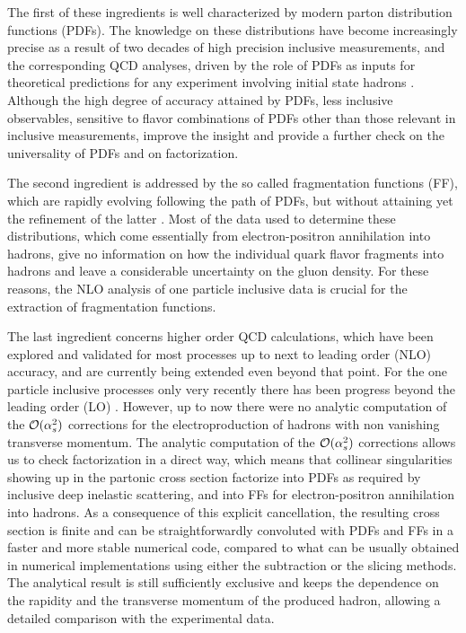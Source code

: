 \documentclass[superscriptaddress,showkeys,showpacs]{revtex4}
\begin{document}
The first of these ingredients is well characterized by modern parton 
distribution functions (PDFs). The knowledge on these distributions 
have become increasingly precise as a result of two decades of high precision 
inclusive measurements, and the corresponding QCD analyses, driven by the role
of PDFs as inputs for theoretical predictions for any experiment involving 
initial state hadrons \cite{MRST04,CTEQ}. Although the high degree of accuracy 
attained by PDFs, 
less inclusive observables, sensitive to flavor combinations of PDFs other 
than those relevant in inclusive measurements, improve the insight and 
provide a further check on the universality of PDFs and on factorization. 

The second ingredient is addressed by the so called fragmentation functions 
(FF), which are rapidly evolving following the path of PDFs, but without 
attaining yet the refinement of the latter \cite{KKP,kretzer}. Most of the 
data used to determine these distributions, which come essentially from 
electron-positron 
annihilation into hadrons, give no information on how the individual quark 
flavor fragments into hadrons and leave a considerable uncertainty on the 
gluon density. For these reasons, the NLO analysis of one particle inclusive 
data is crucial for the extraction of fragmentation functions.  

The last ingredient concerns higher order QCD calculations, which have been 
explored and validated for most processes up to next to leading order (NLO) 
accuracy, and are currently being extended even beyond that point. 
For the one particle inclusive processes only very recently there has been 
progress beyond the leading order (LO) 
\cite{gluon,quark,aure,Fontannaz:2004ev,Maniatis:2004xk}. 
However, up to now there were no analytic computation of the 
${\cal{O}}(\alpha_s^2)$ corrections for the 
electroproduction of hadrons with non vanishing transverse momentum. The 
analytic computation of the ${\cal{O}}(\alpha_s^2)$ corrections allows us to 
check factorization in a direct way, which means that collinear 
singularities showing up in the partonic cross section
factorize into PDFs as required by inclusive deep inelastic scattering, 
and into FFs for electron-positron annihilation into hadrons.
As a consequence of this explicit cancellation, the resulting cross section
is finite and can be straightforwardly convoluted with PDFs and FFs in a faster
and more stable numerical code, compared to what can be usually obtained in 
numerical implementations using either the subtraction \cite{Maniatis:2004xk}
 or the slicing \cite{aure,Fontannaz:2004ev} methods.
The analytical result is still sufficiently exclusive and keeps the dependence 
on the rapidity and the transverse momentum of the produced hadron, allowing 
a detailed comparison with the experimental data.
\end{document}
